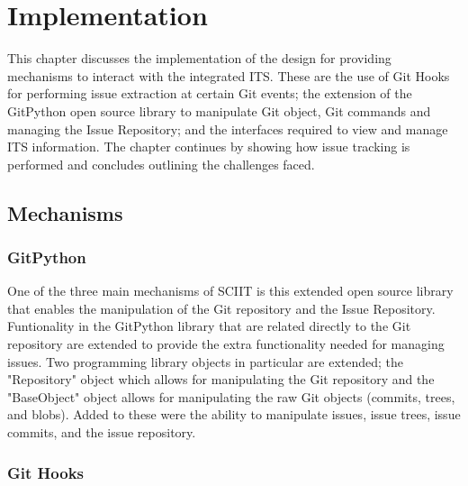 \documentclass{mproj}
\begin{document}
\chapter{Implementation}\label{implementation}

This chapter discusses the implementation of the design for providing mechanisms to interact with the integrated ITS. These are the use of Git Hooks for performing issue extraction at certain Git events; the extension of the GitPython open source library to manipulate Git object, Git commands and managing the Issue Repository; and the interfaces required to view and manage ITS information. The chapter continues by showing how issue tracking is performed and concludes outlining the challenges faced.

\section{Mechanisms}

\subsection{GitPython}

One of the three main mechanisms of SCIIT is this extended open source library that enables the manipulation of the Git repository and the Issue Repository. Funtionality in the GitPython library that are related directly to the Git repository are extended to provide the extra functionality needed for managing issues. Two programming library objects in particular are extended; the "Repository" object which allows for manipulating the Git repository and the "BaseObject" object allows for manipulating the raw Git objects (commits, trees, and blobs). Added to these were the ability to manipulate issues, issue trees, issue commits, and the issue repository.


\subsection{Git Hooks}
\end{document}
